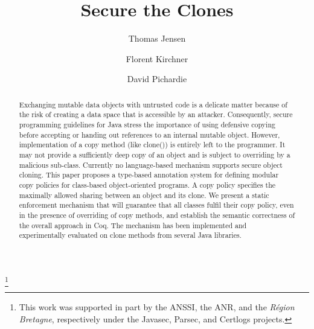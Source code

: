\documentclass{LMCS}
\begin{document}
\title{Secure the Clones}

\author [T.~Jensen]{Thomas Jensen}
\author [F.~Kirchner]{Florent Kirchner}
\author [D.~Pichardie]{David Pichardie}
\address{INRIA Rennes -- Bretagne Atlantique, France}
\thanks {This work was supported in part by the ANSSI, the ANR, and the
         \emph{R\'egion Bretagne}, respectively under the Javasec, Parsec, and
         Certlogs projects.}




\begin{abstract}
  Exchanging mutable data objects with untrusted code is a delicate
  matter because of the risk of creating a data space that is
  accessible by an attacker. Consequently, secure programming guidelines for
  Java stress the importance of using defensive copying before accepting or
  handing out references to an internal mutable object.
However, implementation of a copy method (like clone()) is entirely
  left to the programmer. It may not provide a sufficiently deep copy of
  an object and is subject to overriding by a malicious sub-class. Currently 
  no language-based mechanism supports secure object cloning. 
This paper proposes a type-based annotation system for defining modular
  copy policies for class-based object-oriented programs. 
  A copy policy specifies the maximally allowed sharing between an
  object and its clone. We present a static
  enforcement mechanism that will guarantee that all classes fulfil their
  copy policy, even in the presence of overriding of copy methods, and  
  establish the semantic correctness of the overall approach in Coq.
The mechanism has been implemented and experimentally evaluated on
  clone methods from several Java libraries.
\end{abstract}
\end{document}

